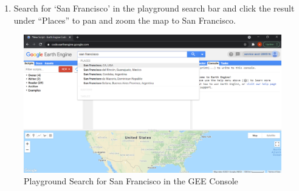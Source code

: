 \documentclass[
]{article}
\providecommand{\tightlist}{%
  \setlength{\itemsep}{0pt}\setlength{\parskip}{0pt}}
\begin{document}
\begin{enumerate}
\def\labelenumi{\alph{enumi}.}
\tightlist
\item
  Search for `San Francisco' in the playground search bar and click the result under ``Places'' to pan and zoom the map to San Francisco.
\end{enumerate}

\begin{figure}

{\centering \includegraphics[width=0.95\linewidth]{sf_gee_example} 

}

\caption{Playground Search for San Francisco in the GEE Console}\label{fig:sfgeeexample}
\end{figure}
\end{document}
